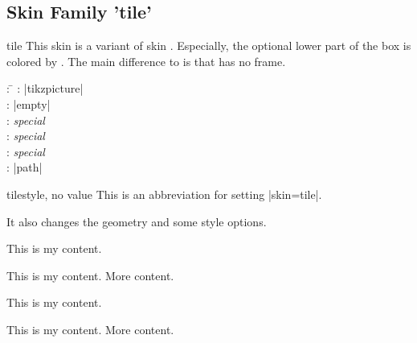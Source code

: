 \subsection{Skin Family 'tile'}
\begin{docSkin}[doc new=2016-02-25]{tile}
  This skin is a variant of skin . Especially, the
  optional lower part of the box is colored by .
  The main difference to  is that  has no
  frame.
\begin{tcolorbox}[skintable=tile]
  \begin{tabbing}
    : \=\kill
    :  \> |tikzpicture|\\ 
    :           \> |empty|\\
    : \> \emph{special}\\ 
    :        \> \emph{special}\\
    :    \> \emph{special}\\
    :           \> |path|
  \end{tabbing}
\end{tcolorbox}
\end{docSkin}

\begin{docTcbKey}[][doc new=2016-02-25]{tile}{}{style, no value}
  This is an abbreviation for setting |skin=tile|.
  \begin{marker}It also changes the geometry and some style options.\end{marker}
\end{docTcbKey}


\begin{dispExample}
\begin{tcbraster}[tile,raster equal height,raster columns=4,
    colback=LightGreen,colframe=DarkGreen,colbacklower=LimeGreen!75!LightGreen,
    colbacktitle=LimeGreen!75!DarkGreen,
    left=1mm,right=1mm,top=1mm,bottom=1mm,middle=1mm]
  \begin{tcolorbox}
    This is my content.
  \end{tcolorbox}
  \begin{tcolorbox}
    This is my content.
    \tcblower
    More content.
  \end{tcolorbox}
  \begin{tcolorbox}[adjusted title=My title]
    This is my content.
  \end{tcolorbox}
  \begin{tcolorbox}[adjusted title=My title]
    This is my content.
    \tcblower
    More content.
  \end{tcolorbox}
\end{tcbraster}
\end{dispExample}


